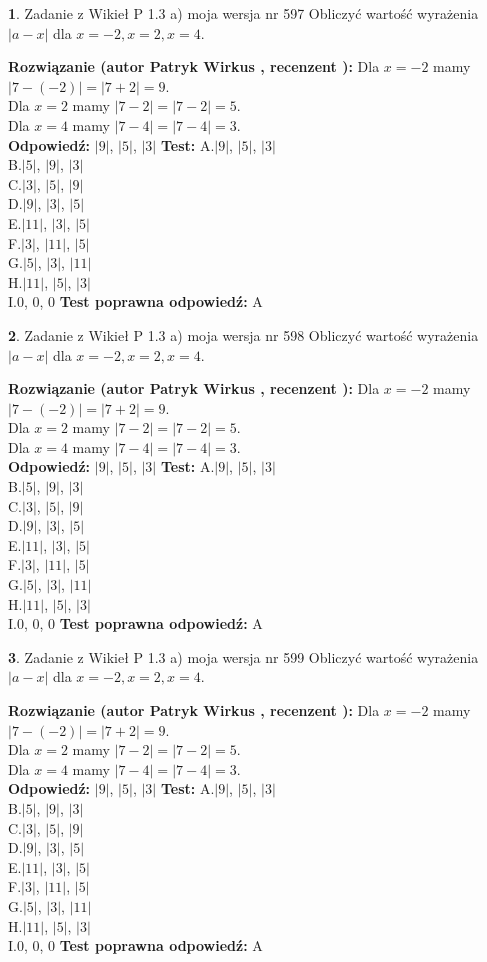 \documentclass[12pt, a4paper]{article}
\theoremstyle{definition} %
\newtheorem{zad}{}
\newcommand{\zadStart}[1]{\begin{zad}#1\newline}
\newcommand{\zadStop}{\end{zad}}
\newcommand{\rozwStart}[2]{\noindent \textbf{Rozwiązanie (autor #1 , recenzent #2): }\newline}
\newcommand{\rozwStop}{\newline}
\newcommand{\odpStart}{\noindent \textbf{Odpowiedź:}\newline}
\newcommand{\odpStop}{\newline}
\newcommand{\testStart}{\noindent \textbf{Test:}\newline}
\newcommand{\testStop}{\newline}
\newcommand{\kluczStart}{\noindent \textbf{Test poprawna odpowiedź:}\newline}
\newcommand{\kluczStop}{\newline}
\begin{document}
\zadStart{Zadanie z Wikieł P 1.3 a) moja wersja nr 597}
Obliczyć wartość wyrażenia $|a - x|$ dla $x=-2,x=2,x=4$.
\zadStop
\rozwStart{Patryk Wirkus}{}
Dla $x = -2$ mamy $|7 - (-2)| = |7 + 2| = 9$.\\
Dla $x = 2$ mamy $|7 - 2| = |7 - 2| = 5$.\\
Dla $x = 4$ mamy $|7 - 4| = |7 - 4| = 3$.\\
\rozwStop
\odpStart
$|9|$, $|5|$, $|3|$
\odpStop
\testStart
A.$|9|$, $|5|$, $|3|$\\
B.$|5|$, $|9|$, $|3|$\\
C.$|3|$, $|5|$, $|9|$\\
D.$|9|$, $|3|$, $|5|$\\
E.$|11|$, $|3|$, $|5|$\\
F.$|3|$, $|11|$, $|5|$\\
G.$|5|$, $|3|$, $|11|$\\
H.$|11|$, $|5|$, $|3|$\\
I.$0$, $0$, $0$
\testStop
\kluczStart
A
\kluczStop



\zadStart{Zadanie z Wikieł P 1.3 a) moja wersja nr 598}
Obliczyć wartość wyrażenia $|a - x|$ dla $x=-2,x=2,x=4$.
\zadStop
\rozwStart{Patryk Wirkus}{}
Dla $x = -2$ mamy $|7 - (-2)| = |7 + 2| = 9$.\\
Dla $x = 2$ mamy $|7 - 2| = |7 - 2| = 5$.\\
Dla $x = 4$ mamy $|7 - 4| = |7 - 4| = 3$.\\
\rozwStop
\odpStart
$|9|$, $|5|$, $|3|$
\odpStop
\testStart
A.$|9|$, $|5|$, $|3|$\\
B.$|5|$, $|9|$, $|3|$\\
C.$|3|$, $|5|$, $|9|$\\
D.$|9|$, $|3|$, $|5|$\\
E.$|11|$, $|3|$, $|5|$\\
F.$|3|$, $|11|$, $|5|$\\
G.$|5|$, $|3|$, $|11|$\\
H.$|11|$, $|5|$, $|3|$\\
I.$0$, $0$, $0$
\testStop
\kluczStart
A
\kluczStop



\zadStart{Zadanie z Wikieł P 1.3 a) moja wersja nr 599}
Obliczyć wartość wyrażenia $|a - x|$ dla $x=-2,x=2,x=4$.
\zadStop
\rozwStart{Patryk Wirkus}{}
Dla $x = -2$ mamy $|7 - (-2)| = |7 + 2| = 9$.\\
Dla $x = 2$ mamy $|7 - 2| = |7 - 2| = 5$.\\
Dla $x = 4$ mamy $|7 - 4| = |7 - 4| = 3$.\\
\rozwStop
\odpStart
$|9|$, $|5|$, $|3|$
\odpStop
\testStart
A.$|9|$, $|5|$, $|3|$\\
B.$|5|$, $|9|$, $|3|$\\
C.$|3|$, $|5|$, $|9|$\\
D.$|9|$, $|3|$, $|5|$\\
E.$|11|$, $|3|$, $|5|$\\
F.$|3|$, $|11|$, $|5|$\\
G.$|5|$, $|3|$, $|11|$\\
H.$|11|$, $|5|$, $|3|$\\
I.$0$, $0$, $0$
\testStop
\kluczStart
A
\kluczStop
\end{document}
